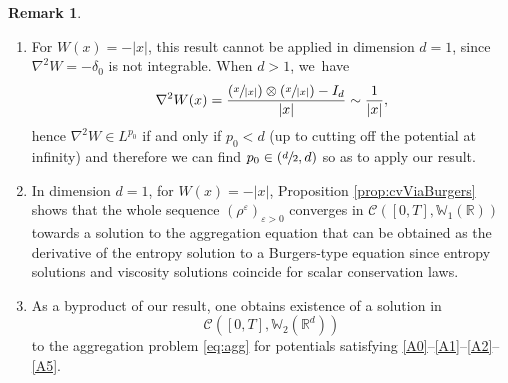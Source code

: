 \documentclass[JEP,XML,SOM,Unicode, NoFloatCountersInSection,published]{cedram}
\newcommand{\Psfrac}[2]{(\sfrac{#1}{#2})}
\def\RR{\mathbb{R}}
\def\WW{\mathbb{W}}
\def\eps{\varepsilon}
\def\calC{{\mathcal C}}
\theoremstyle{plain}
\theoremstyle{definition}
\newtheorem{remark}[theorem]{Remark}
\begin{document}
\skpt
\begin{remark}
\begin{enumerate}
\item For $W(x) = -|x|$, this result cannot be applied in dimension $d=1$, since $\nabla^2 W = - \delta_0$ is not integrable. When $d>1$, we~have
\[
\nabla^2 W(x) = \frac{\Psfrac{x}{|x|} \otimes \Psfrac{x}{|x|} - I_d}{|x|} \sim \frac{1}{|x|},
\]
hence $\nabla^2 W \in L^{p_0}$ if and only if $p_0 < d$ (up to cutting off the potential at infinity) and therefore we can find $p_0 \in(\sfrac d2, d)$ so as to apply our result.
\item In dimension $d=1$, for $W(x) = - |x|$, Proposition \ref{prop:cvViaBurgers} shows that the whole sequence $(\rho^\eps)_{\eps > 0}$ converges in $\calC([0,T], \WW_1(\RR))$ towards a solution to the aggregation equation that can be obtained as the derivative of the entropy solution to a Burgers-type equation since entropy solutions and viscosity solutions coincide for scalar conservation laws.
\item As a byproduct of our result, one obtains existence of a solution in
\[
\calC([0,T], \WW _2(\RR^d))
\]
to the aggregation problem \eqref{eq:agg} for potentials satisfying \eqref{A0}--\eqref{A1}--\eqref{A2}--\eqref{A5}.
\end{enumerate}
\end{remark}
\end{document}
